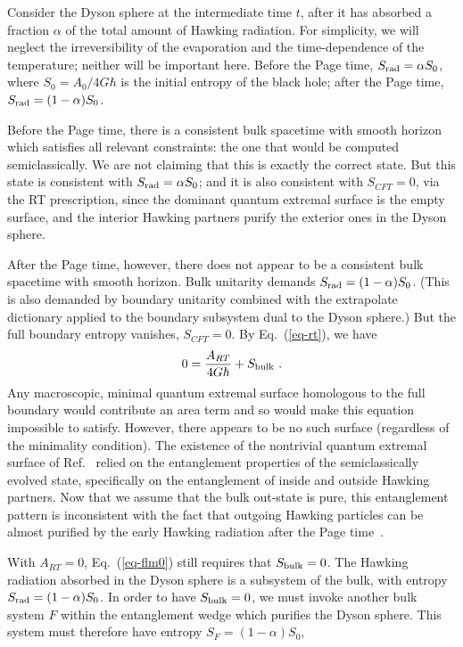 \documentclass[12pt,letterpaper]{article}
\begin{document}
Consider the Dyson sphere at the intermediate time $t$, after it has absorbed a fraction $\alpha$ of the total amount of Hawking radiation. For simplicity, we will neglect the irreversibility of the evaporation and the time-dependence of the temperature; neither will be important here. Before the Page time, $S_{\rm rad}=\alpha S_0$, where $S_0=A_0/4G\hbar$ is the initial entropy of the black hole; after the Page time, $S_{\rm rad}=(1-\alpha) S_0$.

Before the Page time, there is a consistent bulk spacetime with smooth horizon which satisfies all relevant constraints: the one that would be computed semiclassically. We are not claiming that this is exactly the correct state. But this state is consistent with $S_{\rm rad}=\alpha S_0$; and it is also consistent with $S_{CFT}=0$, via the RT prescription, since the dominant quantum extremal surface is the empty surface, and the interior Hawking partners purify the exterior ones in the Dyson sphere.

After the Page time, however, there does not appear to be a consistent bulk spacetime with smooth horizon. Bulk unitarity demands $S_{\rm rad}=(1-\alpha) S_0$. (This is also demanded by boundary unitarity combined with the extrapolate dictionary applied to the boundary subsystem dual to the Dyson sphere.) But the full boundary entropy vanishes, $S_{CFT}=0$. By Eq.~(\ref{eq-rt}), we have
\begin{equation}
  0 = \frac{A_{RT}}{4G\hbar}+ S_{\rm bulk}~.
  \label{eq-flm0}
\end{equation}
Any macroscopic, minimal quantum extremal surface homologous to the full boundary would contribute an area term and so would make this equation impossible to satisfy. However, there appears to be no such surface (regardless of the minimality condition). The existence of the nontrivial quantum extremal surface of Ref.~\cite{Pen19,AEMM} relied on the entanglement properties of the semiclassically evolved state, specifically on the entanglement of inside and outside Hawking partners. Now that we assume that the bulk out-state is pure, this entanglement pattern is inconsistent with the fact that outgoing Hawking particles can be almost purified by the early Hawking radiation after the Page time~\cite{AMPS}. 

With $A_{RT}=0$, Eq.~(\ref{eq-flm0}) still requires that $S_{\rm bulk}=0$. The Hawking radiation absorbed in the Dyson sphere is a subsystem of the bulk, with entropy $S_{\rm rad}=(1-\alpha) S_0$. In order to have $S_{\rm bulk}=0$, we must invoke another bulk system $F$ within the entanglement wedge which purifies the Dyson sphere. This system must therefore have entropy $S_F=(1-\alpha) S_0$,
\end{document}
